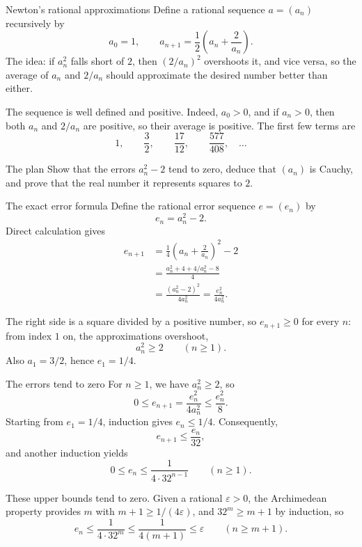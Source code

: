 \documentclass[aspectratio=169,11pt]{beamer}
\begin{document}
\begin{frame}{Newton's rational approximations}
  \small
  Define a rational sequence \(a=(a_n)\) recursively by
  \[
    a_0=1,
    \qquad
    a_{n+1}=\frac12\left(a_n+\frac2{a_n}\right).
  \]
  The idea: if \(a_n^2\) falls short of \(2\), then \((2/a_n)^2\) overshoots
  it, and vice versa, so the average of \(a_n\) and \(2/a_n\) should
  approximate the desired number better than either.

  The sequence is well defined and positive.  Indeed, \(a_0>0\), and if
  \(a_n>0\), then both \(a_n\) and \(2/a_n\) are positive, so their average
  is positive.  The first few terms are
  \[
    1,\qquad
    \frac32,\qquad
    \frac{17}{12},\qquad
    \frac{577}{408},\quad\ldots
  \]

  \begin{alertblock}{The plan}
    Show that the errors \(a_n^2-2\) tend to zero, deduce that \((a_n)\) is
    Cauchy, and prove that the real number it represents squares to \(2\).
  \end{alertblock}
\end{frame}

\begin{frame}{The exact error formula}
  \small
  Define the rational error sequence \(e=(e_n)\) by
  \[
    e_n=a_n^2-2.
  \]
  Direct calculation gives
  \begin{align*}
    e_{n+1}
      &=\frac14\left(a_n+\frac2{a_n}\right)^2-2\\
      &=\frac{a_n^2+4+4/a_n^2-8}{4}\\
      &=\boxed{\frac{(a_n^2-2)^2}{4a_n^2}}
       =\frac{e_n^2}{4a_n^2}.
  \end{align*}

  The right side is a square divided by a positive number, so
  \(e_{n+1}\ge0\) for every \(n\): from index \(1\) on, the approximations
  overshoot,
  \[
    a_n^2\ge2\qquad(n\ge1).
  \]
  Also \(a_1=3/2\), hence \(e_1=1/4\).
\end{frame}

\begin{frame}{The errors tend to zero}
  \small
  For \(n\ge1\), we have \(a_n^2\ge2\), so
  \[
    0\le e_{n+1}
      =\frac{e_n^2}{4a_n^2}
      \le\frac{e_n^2}{8}.
  \]
  Starting from \(e_1=1/4\), induction gives \(e_n\le1/4\).  Consequently,
  \[
    e_{n+1}\le\frac{e_n}{32},
  \]
  and another induction yields
  \[
    \boxed{0\le e_n\le\frac1{4\cdot32^{n-1}}\qquad(n\ge1).}
  \]

  These upper bounds tend to zero.  Given a rational \(\varepsilon>0\), the
  Archimedean property provides \(m\) with \(m+1\ge1/(4\varepsilon)\), and
  \(32^m\ge m+1\) by induction, so
  \[
    e_n\le\frac1{4\cdot32^{m}}\le\frac1{4(m+1)}\le\varepsilon
    \qquad(n\ge m+1).
  \]
\end{frame}
\end{document}
